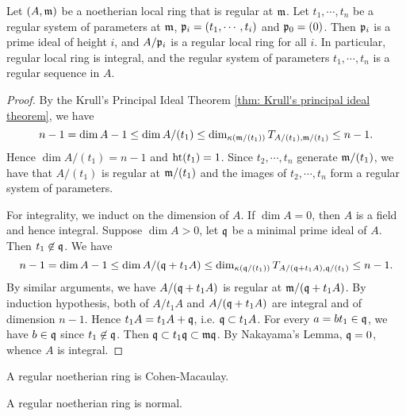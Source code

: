     \begin{proposition}\label{prop: regular system of parameters is a regular sequence}
        Let \((A,{\mathfrak{m}})\) be a noetherian local ring that is regular at \({\mathfrak{m}}\).
        Let \(t_1,\cdots,t_n\) be a regular system of parameters at \({\mathfrak{m}}\), \({\mathfrak{p}}_i = (t_1,\cdots,t_i)\) and \({\mathfrak{p}}_0 = (0)\).
        Then \({\mathfrak{p}}_i\) is a prime ideal of height \(i\), and \(A/{\mathfrak{p}}_i\) is a regular local ring for all \(i\).
        In particular, regular local ring is integral, and the regular system of parameters \(t_1,\cdots,t_n\) is a regular sequence in \(A\).
    \end{proposition}
    \begin{proof}
        By the Krull's Principal Ideal Theorem \ref{thm: Krull's principal ideal theorem}, we have 
        \[ n-1 = \dim A - 1 \leq \dim A/(t_1) \leq \dim_{{\kappa}({\mathfrak{m}}/(t_1))} T_{A/(t_1), {\mathfrak{m}}/(t_1)} \leq n-1.  \]
        Hence \(\dim A/(t_1) = n-1\) and \(\operatorname{ht} (t_1) = 1\).
        Since \(t_2,\cdots,t_n\) generate \({\mathfrak{m}}/(t_1)\), we have that \(A/(t_1)\) is regular at \({\mathfrak{m}}/(t_1)\) and the images of \(t_2,\cdots,t_n\) form a regular system of parameters.
    
        For integrality, we induct on the dimension of \(A\).
        If \(\dim A = 0\), then \(A\) is a field and hence integral.
        Suppose \(\dim A > 0\), let \({\mathfrak{q}}\) be a minimal prime ideal of \(A\).
        Then \(t_1 \not\in {\mathfrak{q}}\).
        We have 
        \[ n - 1 = \dim A - 1 \leq \dim A/({\mathfrak{q}} + t_1A) \leq \dim_{{\kappa}({\mathfrak{q}}/(t_1))} T_{A/({\mathfrak{q}} + t_1A), {\mathfrak{q}}/(t_1)} \leq n - 1. \]
        By similar arguments, we have \(A/({\mathfrak{q}} + t_1A)\) is regular at \({\mathfrak{m}}/({\mathfrak{q}} + t_1A)\).
        By induction hypothesis, both of \(A/t_1A\) and \(A/({\mathfrak{q}} + t_1A)\) are integral and of dimension \(n-1\).
        Hence \(t_1 A = t_1 A + {\mathfrak{q}}\), i.e. \({\mathfrak{q}} \subset t_1 A\).
        For every \(a = bt_1 \in {\mathfrak{q}}\), we have \(b \in {\mathfrak{q}}\) since \(t_1 \not\in {\mathfrak{q}}\).
        Then \({\mathfrak{q}} \subset t_1{\mathfrak{q}} \subset {\mathfrak{m}} {\mathfrak{q}}\).
        By Nakayama's Lemma, \({\mathfrak{q}} = 0\), whence \(A\) is integral. 
    \end{proof}

    \begin{corollary}\label{cor: regular ring is Cohen-Macaulay}
        A regular noetherian ring is Cohen-Macaulay.
    \end{corollary}

    \begin{corollary}\label{cor: regular ring is normal}
        A regular noetherian ring is normal.
    \end{corollary}

